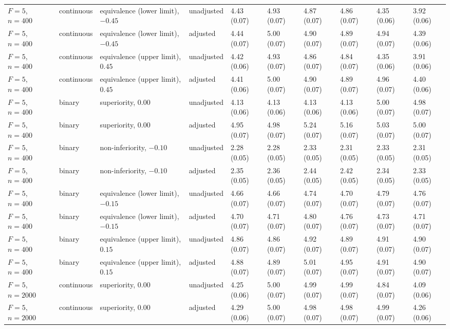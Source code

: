 \begin{landscape}
\begin{singlespace}
\begin{longtable}{@{}llllllllll@{}}
$F=5$, $n=400$ & continuous & equivalence (lower limit), $-0.45$ & unadjusted & 4.43 (0.07) & 4.93 (0.07) & 4.87 (0.07) & 4.86 (0.07) & 4.35 (0.06) & 3.92 (0.06)\\
$F=5$, $n=400$ & continuous & equivalence (lower limit), $-0.45$ & adjusted & 4.44 (0.07) & 5.00 (0.07) & 4.90 (0.07) & 4.89 (0.07) & 4.94 (0.07) & 4.39 (0.06)\\
$F=5$, $n=400$ & continuous & equivalence (upper limit), $0.45$ & unadjusted & 4.42 (0.06) & 4.93 (0.07) & 4.86 (0.07) & 4.84 (0.07) & 4.35 (0.06) & 3.91 (0.06)\\
$F=5$, $n=400$ & continuous & equivalence (upper limit), $0.45$ & adjusted & 4.41 (0.06) & 5.00 (0.07) & 4.90 (0.07) & 4.89 (0.07) & 4.96 (0.07) & 4.40 (0.06)\\
$F=5$, $n=400$ & binary & superiority, $0.00$ & unadjusted & 4.13 (0.06) & 4.13 (0.06) & 4.13 (0.06) & 4.13 (0.06) & 5.00 (0.07) & 4.98 (0.07)\\
$F=5$, $n=400$ & binary & superiority, $0.00$ & adjusted & 4.95 (0.07) & 4.98 (0.07) & 5.24 (0.07) & 5.16 (0.07) & 5.03 (0.07) & 5.00 (0.07)\\
$F=5$, $n=400$ & binary & non-inferiority, $-0.10$ & unadjusted & 2.28 (0.05) & 2.28 (0.05) & 2.33 (0.05) & 2.31 (0.05) & 2.33 (0.05) & 2.31 (0.05)\\
$F=5$, $n=400$ & binary & non-inferiority, $-0.10$ & adjusted & 2.35 (0.05) & 2.36 (0.05) & 2.44 (0.05) & 2.42 (0.05) & 2.34 (0.05) & 2.33 (0.05)\\
$F=5$, $n=400$ & binary & equivalence (lower limit), $-0.15$ & unadjusted & 4.66 (0.07) & 4.66 (0.07) & 4.74 (0.07) & 4.70 (0.07) & 4.79 (0.07) & 4.76 (0.07)\\
$F=5$, $n=400$ & binary & equivalence (lower limit), $-0.15$ & adjusted & 4.70 (0.07) & 4.71 (0.07) & 4.80 (0.07) & 4.76 (0.07) & 4.73 (0.07) & 4.71 (0.07)\\
$F=5$, $n=400$ & binary & equivalence (upper limit), $0.15$ & unadjusted & 4.86 (0.07) & 4.86 (0.07) & 4.92 (0.07) & 4.89 (0.07) & 4.91 (0.07) & 4.90 (0.07)\\
$F=5$, $n=400$ & binary & equivalence (upper limit), $0.15$ & adjusted & 4.88 (0.07) & 4.89 (0.07) & 5.01 (0.07) & 4.95 (0.07) & 4.91 (0.07) & 4.90 (0.07)\\
$F=5$, $n=2000$ & continuous & superiority, $0.00$ & unadjusted & 4.25 (0.06) & 5.00 (0.07) & 4.99 (0.07) & 4.99 (0.07) & 4.84 (0.07) & 4.09 (0.06)\\
$F=5$, $n=2000$ & continuous & superiority, $0.00$ & adjusted & 4.29 (0.06) & 5.00 (0.07) & 4.98 (0.07) & 4.98 (0.07) & 4.99 (0.07) & 4.26 (0.06)\\

\end{longtable}
\end{singlespace}
\end{landscape}
